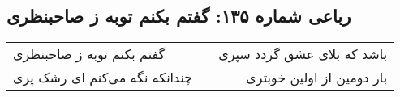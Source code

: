 \begin{center}
\section*{رباعی شماره ۱۳۵: گفتم بکنم توبه ز صاحبنظری}
\label{sec:135}
\begin{longtable}{l p{0.5cm} r}
گفتم بکنم توبه ز صاحبنظری
&&
باشد که بلای عشق گردد سپری
\\
چندانکه نگه می‌کنم ای رشک پری
&&
بار دومین از اولین خوبتری
\\
\end{longtable}
\end{center}
